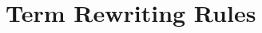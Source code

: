 \documentclass[runningheads]{llncs}
\begin{document}






\section{Term Rewriting Rules}

\end{document}
